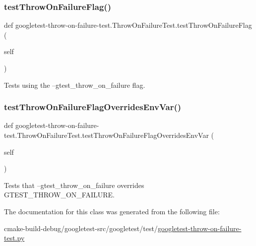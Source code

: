 \subsubsection{\texorpdfstring{testThrowOnFailureFlag()}{testThrowOnFailureFlag()}}
{\footnotesize\ttfamily def googletest-\/throw-\/on-\/failure-\/test.\+Throw\+On\+Failure\+Test.\+test\+Throw\+On\+Failure\+Flag (\begin{DoxyParamCaption}\item[{}]{self }\end{DoxyParamCaption})}

\begin{DoxyVerb}Tests using the --gtest_throw_on_failure flag.\end{DoxyVerb}
 \mbox{\label{classgoogletest-throw-on-failure-test_1_1ThrowOnFailureTest_a18515553dbfe7b3e6ed6449fa81893c1}} 
\subsubsection{\texorpdfstring{testThrowOnFailureFlagOverridesEnvVar()}{testThrowOnFailureFlagOverridesEnvVar()}}
{\footnotesize\ttfamily def googletest-\/throw-\/on-\/failure-\/test.\+Throw\+On\+Failure\+Test.\+test\+Throw\+On\+Failure\+Flag\+Overrides\+Env\+Var (\begin{DoxyParamCaption}\item[{}]{self }\end{DoxyParamCaption})}

\begin{DoxyVerb}Tests that --gtest_throw_on_failure overrides GTEST_THROW_ON_FAILURE.\end{DoxyVerb}
 

The documentation for this class was generated from the following file\+:\begin{DoxyCompactItemize}
\item 
cmake-\/build-\/debug/googletest-\/src/googletest/test/\mbox{\hyperlink{googletest-throw-on-failure-test_8py}{googletest-\/throw-\/on-\/failure-\/test.\+py}}\end{DoxyCompactItemize}
